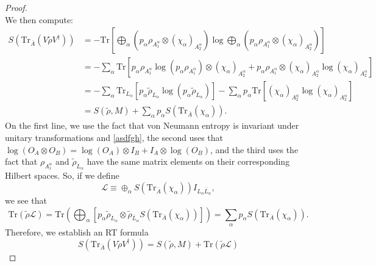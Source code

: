 \documentclass[12pt,a4paper]{report}
\numberwithin{equation}{section}
\newcommand{\ol}[1]{\overline{#1}}
\newcommand{\tr}{\text{Tr}}
\theoremstyle{definition}
\theoremstyle{theorem}
\theoremstyle{theorem}
\theoremstyle{example}
\theoremstyle{definition}
\begin{document}
\begin{proof}
\begin{equation}
	\end{equation}
	We then compute:
	\begin{equation}
		\begin{aligned}
			S\left(\tr_{\ol{A}}\left(V\tilde{\rho}V^{\dagger}\right)\right)&=-\tr\left[\bigoplus_{\alpha}\left(p_{\alpha}\rho_{A_{1}^{\alpha}}\otimes\left(\chi_{\alpha}\right)_{A_{2}^{\alpha}}\right)\log\bigoplus_{\alpha}\left(p_{\alpha}\rho_{A_{1}^{\alpha}}\otimes\left(\chi_{\alpha}\right)_{A_{2}^{\alpha}}\right)\right]\\
			&=-\sum_{\alpha}\tr\left[p_{\alpha}\rho_{A_{1}^{\alpha}}\log\left(p_{\alpha}\rho_{A_{1}^{\alpha}}\right)\otimes\left(\chi_{\alpha}\right)_{A_{2}^{\alpha}}+p_{\alpha}\rho_{A_{1}^{\alpha}}\otimes\left(\chi_{\alpha}\right)_{A_{2}^{\alpha}}\log\left(\chi_{\alpha}\right)_{A_{2}^{\alpha}}\right]\\
			&=-\sum_{\alpha}\tr_{L_{\alpha}}\left[p_{\alpha}\tilde{\rho}_{L_{\alpha}}\log\left(p_{\alpha}\tilde{\rho}_{L_{\alpha}}\right)\right]-\sum_{\alpha}p_{\alpha}\tr\left[\left(\chi_{\alpha}\right)_{A_{2}^{\alpha}}\log\left(\chi_{\alpha}\right)_{A_{2}^{\alpha}}\right]\\
			&=S(\tilde{\rho},M)+\sum_{\alpha}p_{\alpha}S\left(\tr_{\ol{A}}\left(\chi_{\alpha}\right)\right).
		\end{aligned}
	\end{equation}
	On the first line, we use the fact that von Neumann entropy is invariant under unitary transformations and \ref{asdfgh}, the second uses that $\log(O_{A}\otimes O_{B})=\log(O_{A})\otimes I_{B}+I_{A}\otimes\log(O_{B})$, and the third uses the fact that $\rho_{A_{1}^{\alpha}}$ and $\tilde{\rho}_{L_{\alpha}}$ have the same matrix elements on their corresponding Hilbert spaces. So, if we define
	\begin{equation}
		\mathcal{L}\equiv \oplus_{\alpha}S\left(\tr_{\ol{A}}\left(\chi_{\alpha}\right)\right)I_{L_{\alpha}\ol{L}_{\alpha}},
	\end{equation}
	we see that
	\begin{equation}
		\tr\left(\tilde{\rho}\mathcal{L}\right)=\tr\left(\bigoplus_{\alpha}\left[p_{\alpha}\tilde{\rho}_{L_{\alpha}}\otimes\tilde{\rho}_{\ol{L}_{\alpha}}S\left(\tr_{\ol{A}}\left(\chi_{\alpha}\right)\right)\right]\right)=\sum_{\alpha}p_{\alpha}S\left(\tr_{\ol{A}}\left(\chi_{\alpha}\right)\right).
	\end{equation}
	Therefore, we establish an RT formula
	\begin{equation}\label{RTyay}
		S\left(\tr_{\ol{A}}\left(V\tilde{\rho}V^{\dagger}\right)\right)=S(\tilde{\rho},M)+\tr\left(\tilde{\rho}\mathcal{L}\right)

\end{equation}
\end{proof}
\end{document}
